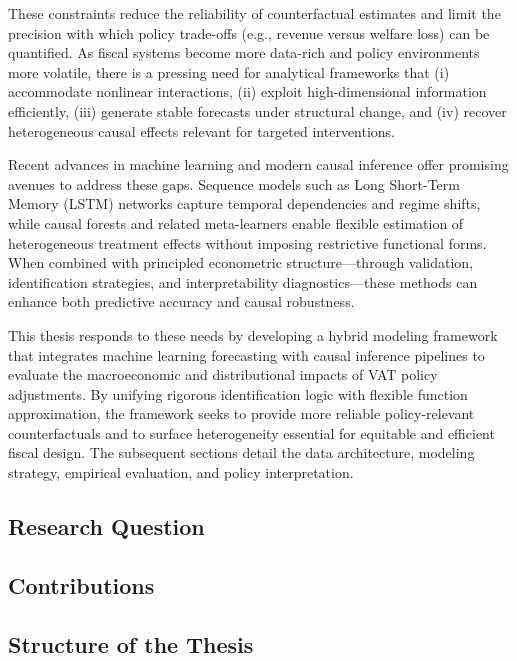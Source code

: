 These constraints reduce the reliability of counterfactual estimates and limit the precision with which policy trade-offs (e.g., revenue versus welfare loss) can be quantified. As fiscal systems become more data-rich and policy environments more volatile, there is a pressing need for analytical frameworks that (i) accommodate nonlinear interactions, (ii) exploit high-dimensional information efficiently, (iii) generate stable forecasts under structural change, and (iv) recover heterogeneous causal effects relevant for targeted interventions.

Recent advances in machine learning and modern causal inference offer promising avenues to address these gaps. Sequence models such as Long Short-Term Memory (LSTM) networks capture temporal dependencies and regime shifts, while causal forests and related meta-learners enable flexible estimation of heterogeneous treatment effects without imposing restrictive functional forms. When combined with principled econometric structure—through validation, identification strategies, and interpretability diagnostics—these methods can enhance both predictive accuracy and causal robustness.

This thesis responds to these needs by developing a hybrid modeling framework that integrates machine learning forecasting with causal inference pipelines to evaluate the macroeconomic and distributional impacts of VAT policy adjustments. By unifying rigorous identification logic with flexible function approximation, the framework seeks to provide more reliable policy-relevant counterfactuals and to surface heterogeneity essential for equitable and efficient fiscal design. The subsequent sections detail the data architecture, modeling strategy, empirical evaluation, and policy interpretation.


\subsection{Research Question}

\subsection{Contributions}

\subsection{Structure of the Thesis}
